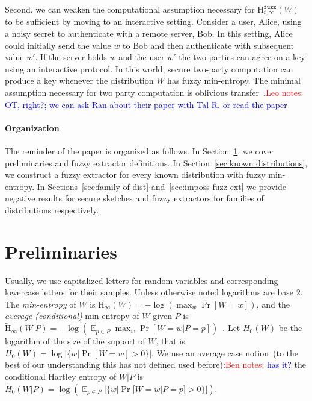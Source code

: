 \documentclass[11pt]{article}
\newcommand{\secref}[1]{\mbox{Section~\ref{#1}}}
\DeclareMathOperator*{\expe}{\mathbb{E}}
\newcommand{\Hoo}{\mathrm{H}_\infty}
\newcommand{\Hav}{\tilde{\mathrm{H}}_\infty}
\newcommand{\Hfuzz}{\mathrm{H}^{\mathtt{fuzz}}_{t,\infty}}
\newcommand{\authnote}[2]{{\textcolor{red}{\textsf{#1 notes: }\textcolor{blue}{ #2}}\marginpar{\textcolor{red}{\textbf{!!!!!}}}}}
\newcommand{\authnote}[2]{}
\newcommand{\bnote}[1]{{\authnote{Ben}{#1}}}
\newcommand{\lnote}[1]{{\authnote{Leo}{#1}}}
\begin{document}
Second, we can weaken the computational assumption necessary for $\Hfuzz(W)$ to be sufficient by moving to an interactive setting.
Consider a user, Alice, using a noisy secret to authenticate with a remote server, Bob.  In this setting, Alice could initially send the value $w$ to Bob and then authenticate with subsequent value $w'$.  If the server holds $w$ and the user $w'$ the two parties can agree on a key using an interactive protocol.
In this world, secure two-party computation can produce a key whenever the distribution $W$ has fuzzy min-entropy.  The minimal assumption necessary for two party computation is oblivious transfer~\cite{yao1986generate,lindell2009proof}.\lnote{OT, right?; we can ask Ran about their paper with Tal R. or read the paper}


\paragraph{Organization} The reminder of the paper is organized as follows.  In \secref{sec:preliminaries}, we cover preliminaries and fuzzy extractor definitions.  In \secref{sec:known distributions}, we construct a fuzzy extractor for every known distribution with fuzzy min-entropy.  In Sections~\ref{sec:family of dist} and~\ref{sec:imposs fuzz ext} we provide negative results for secure sketches and fuzzy extractors for families of distributions respectively.


\section{Preliminaries}
\label{sec:preliminaries}
Usually, we use capitalized letters for random variables and corresponding lowercase letters for their samples.
 Unless otherwise noted logarithms are base $2$.
The {\em min-entropy} of $W$ is $\Hoo(W) = -\log(\max_w \Pr[W=w])$,
and the {\em average (conditional)} min-entropy of $W$ given $P$ is  $\Hav(W|P) = -\log(\expe_{p\in P} \max_{w} \Pr[W=w|P=p])$~\cite[Section 2.4]{DBLP:journals/siamcomp/DodisORS08}.   Let $H_0(W)$ be the logarithm of the size of the support of $W$,  that is $H_0(W) = \log |\{w | \Pr[W=w]>0\}|$.  We use an average case notion~(to the best of our understanding this has not defined used before):\bnote{has it?}
the conditional Hartley entropy of $W |P $ is $\tilde{H}_0(W |P) = \log ( \expe_{p\in P} |\{w | \Pr[W=w |P=p]>0\}|)$.
\end{document}
